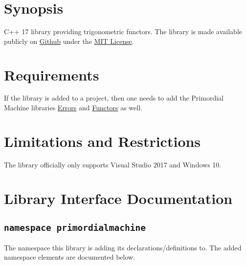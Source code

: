 \documentclass[oneside]{book}
\begin{document}
\frontmatter

\begin{titlepage}
\maketitle
\end{titlepage}

\tableofcontents
{}

\mainmatter

\chapter{Synopsis}
C++ 17 library providing trigonometric functors.
The library is made available publicly on
\href{\GetLibraryRepository}{Github}
under the
\href{\GetLibraryRepository/blob/master/LICENSE}{MIT License}.

\chapter{Requirements}
If the library is added to a project, then one needs to add the Primordial Machine libraries
\href{https://github.com/primordialmachine/errors}{Errors}
and
\href{https://github.com/primordialmachine/functors}{Functors}
as well.

\chapter{Limitations and Restrictions}
The library officially only supports Visual Studio 2017 and Windows 10.




\chapter{Library Interface Documentation}

\section{\texttt{namespace primordialmachine}}
The namespace this library is adding its declarations/definitions to.
The added namespace elements are documented below.
\end{document}

